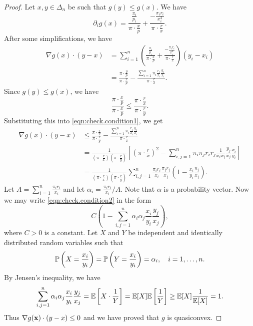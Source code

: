 \documentclass[graybox]{svmult}
\begin{document}
\begin{proof}
Let $x, y \in \Delta_n$ be such that $g(y) \leq g(x)$. We have
\[
\partial_i g(x) = \frac{\frac{\pi_i}{p_i}}{\pi \cdot \frac{x}{p}} + \frac{-\frac{\pi_ir_i}{x_i^2}}{\pi \cdot \frac{r}{x}}.
\]
After some simplifications, we have
\begin{equation} \label{eqn:check.condition1}
\begin{split}
\nabla g(x) \cdot (y - x) &= \sum_{i = 1}^n \left(\frac{\frac{\pi_i}{p_i}}{\pi \cdot \frac{x}{p}} + \frac{-\frac{\pi_ir_i}{x_i^2}}{\pi \cdot \frac{r}{x}} \right) (y_i - x_i) \\
&= \frac{\pi \cdot \frac{y}{p}}{\pi \cdot \frac{x}{p}} - \frac{\sum_{i = 1}^n \pi_i \frac{r_i}{x_i} \frac{y_i}{x_i}}{\pi \cdot \frac{r}{x}}.
\end{split}
\end{equation}
Since $g(y) \leq g(x)$, we have
\[
\frac{\pi \cdot \frac{x}{p}}{\pi \cdot \frac{x}{p}} \leq \frac{\pi \cdot \frac{r}{x}}{\pi \cdot \frac{r}{y}}.
\]
Substituting this into \eqref{eqn:check.condition1}, we get
\begin{equation} \label{eqn:check.condition2}
\begin{split}
\nabla g(x) \cdot (y - x) &\leq \frac{\pi \cdot \frac{r}{x}}{\pi \cdot \frac{r}{y}} - \frac{\sum_{i = 1}^n \pi_i \frac{r_i}{x_i} \frac{y_i}{x_i}}{\pi \cdot \frac{r}{x}} \\
&= \frac{1}{\left(\pi \cdot \frac{r}{x}\right)\left(\pi \cdot \frac{r}{y}\right)} \left[ 
\left(\pi \cdot \frac{r}{x}\right)^2 - \sum_{i, j = 1}^n \pi_i \pi_j  r_ir_j \frac{1}{x_ix_j} \frac{y_j}{x_j} \frac{x_i}{y_i} \right] \\
&= \frac{1}{\left(\pi \cdot \frac{r}{x}\right)\left(\pi \cdot \frac{r}{y}\right)}  \sum_{i, j = 1}^n \frac{\pi_ir_i}{x_i} \frac{\pi_jr_j}{x_j} \left(1 - \frac{x_i}{y_i} \frac{y_j}{x_j} \right).
\end{split}
\end{equation}
Let $A = \sum_{i = 1}^n \frac{\pi_i r_i}{x_i}$ and let $\alpha_i = \frac{\pi_i r_i}{x_i}/A$. Note that $\alpha$ is a probability vector. Now we may write \eqref{eqn:check.condition2} in the form
\[
C \left(1 - \sum_{i, j = 1}^n \alpha_i \alpha_j \frac{x_i}{y_i} \frac{y_j}{x_j}\right),
\]
where $C > 0$ is a constant. Let $X$ and $Y$ be independent and identically distributed random variables such that
\[
{\Bbb P}\left(X = \frac{x_i}{y_i}\right) = {\Bbb P}\left(Y = \frac{x_i}{y_i}\right) = \alpha_i, \quad i = 1, \ldots, n.
\]
By Jensen's inequality, we have
\[
\sum_{i, j = 1}^n \alpha_i \alpha_j \frac{x_i}{y_i} \frac{y_j}{x_j} = {\Bbb E} \left[ X \cdot \frac{1}{Y}\right] = {\Bbb E} [X] {\Bbb E} \left[\frac{1}{Y}\right] \geq {\Bbb E}[X] \frac{1}{{\Bbb E}[X]} = 1.
\]
Thus $\nabla g({\bf x}) \cdot (y - x) \leq 0$ and we have proved that $g$ is quasiconvex.
\end{proof}
\end{document}
